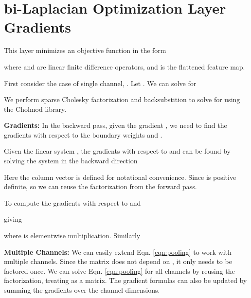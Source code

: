 \documentclass[final]{cvpr}
\begin{document}
\section{bi-Laplacian Optimization Layer Gradients}

This layer minimizes an objective function in the form

where  and  are linear finite difference operators, and  is the flattened feature map. 

First consider the case of single channel, . Let . We can solve for  

We perform sparse Cholesky factorization and backsubstition to solve for  using the Cholmod library\cite{chen2008algorithm}.

\vspace{1mm} \noindent \textbf{Gradients:} In the backward pass, given the gradient , we need to find the gradients with respect to the boundary weights  and .

Given the linear system , the gradients with respect to  and  can be found by solving the system in the backward direction \cite{amos2017optnet}

Here the column vector  is defined for notational convenience. Since  is positive definite,   so we can reuse the factorization from the forward pass.

To compute the gradients with respect to  and 

giving

where  is elementwise multiplication. Similarly


\vspace{1mm} \noindent \textbf{Multiple Channels:} We can easily extend Eqn. \ref{eqn:pooling} to work with multiple channels. Since the matrix  does not depend on , it only needs to be factored once. We can solve Eqn. \ref{eqn:pooling} for all channels by reusing the factorization, treating  as a  matrix. The gradient formulas can also be updated by summing the gradients over the channel dimensions.







\clearpage{}
\end{document}
